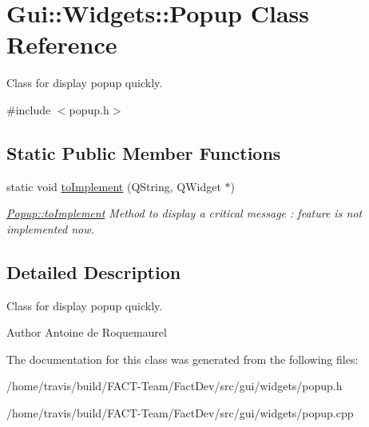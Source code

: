 \hypertarget{classGui_1_1Widgets_1_1Popup}{\section{Gui\-:\-:Widgets\-:\-:Popup Class Reference}
\label{classGui_1_1Widgets_1_1Popup}
}


Class for display popup quickly.  




{\ttfamily \#include $<$popup.\-h$>$}

\subsection*{Static Public Member Functions}
\begin{DoxyCompactItemize}
\item 
\hypertarget{classGui_1_1Widgets_1_1Popup_ac4a9958b16b454eab84eeb95a1f01fa7}{static void \hyperlink{classGui_1_1Widgets_1_1Popup_ac4a9958b16b454eab84eeb95a1f01fa7}{to\-Implement} (Q\-String, Q\-Widget $\ast$)}\label{classGui_1_1Widgets_1_1Popup_ac4a9958b16b454eab84eeb95a1f01fa7}

\begin{DoxyCompactList}\small\item\em \hyperlink{classGui_1_1Widgets_1_1Popup_ac4a9958b16b454eab84eeb95a1f01fa7}{Popup\-::to\-Implement} Method to display a critical message \-: feature is not implemented now. \end{DoxyCompactList}\end{DoxyCompactItemize}


\subsection{Detailed Description}
Class for display popup quickly. 

\begin{DoxyAuthor}{Author}
Antoine de Roquemaurel 
\end{DoxyAuthor}


The documentation for this class was generated from the following files\-:\begin{DoxyCompactItemize}
\item 
/home/travis/build/\-F\-A\-C\-T-\/\-Team/\-Fact\-Dev/src/gui/widgets/popup.\-h\item 
/home/travis/build/\-F\-A\-C\-T-\/\-Team/\-Fact\-Dev/src/gui/widgets/popup.\-cpp\end{DoxyCompactItemize}
